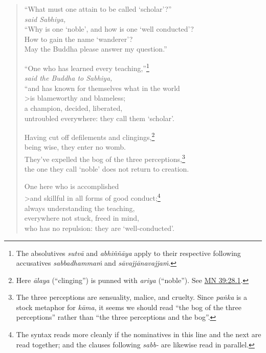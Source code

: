 \documentclass[12pt,openany]{book}%
\newcommand*{\scspeaker}[1]{\hspace{2em}\textit{#1}}
\begin{document}
\begin{verse}%
“What must one attain to be called ‘scholar’?” \\
\scspeaker{said Sabhiya, }\\
“Why is one ‘noble’, and how is one ‘well conducted’? \\
How to gain the name ‘wanderer’? \\
May the Buddha please answer my question.” 

“One who has learned every teaching,”\footnote{The absolutives \textit{\textsanskrit{sutvā}} and \textit{\textsanskrit{abhiññāya}} apply to their respective following accusatives \textit{\textsanskrit{sabbadhammaṁ}} and \textit{\textsanskrit{sāvajjānavajjaṁ}}. } \\
\scspeaker{said the Buddha to Sabhiya, }\\
“and has known for themselves what in the world \\>is blameworthy and blameless; \\
a champion, decided, liberated, \\
untroubled everywhere: they call them ‘scholar’. 

Having cut off defilements and clingings,\footnote{Here \textit{\textsanskrit{ālaya}} (“clinging”) is punned with \textit{ariya} (“noble”). See \href{https://suttacentral.net/mn39/en/sujato\#28.1}{MN 39:28.1}. } \\
being wise, they enter no womb. \\
They’ve expelled the bog of the three perceptions,\footnote{The three perceptions are sensuality, malice, and cruelty. Since \textit{\textsanskrit{paṅka}} is  a stock metaphor for \textit{\textsanskrit{kāma}}, it seems we should read “the bog of the three perceptions” rather than “the three perceptions and the bog”. } \\
the one they call ‘noble’ does not return to creation. 

One here who is accomplished \\>and skillful in all forms of good conduct;\footnote{The syntax reads more cleanly if the nominatives in this line and the next are read together; and the clauses following \textit{sabb-} are likewise read in parallel. } \\
always understanding the teaching, \\
everywhere not stuck, freed in mind, \\
who has no repulsion: they are ‘well-conducted’. 


\end{verse}
\end{document}
